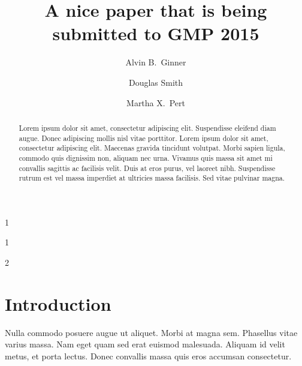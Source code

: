 \documentclass[submission]{gmp2015}
\begin{document}
%
%
\title{A nice paper that is being submitted to GMP 2015}

%
%

%
%
\author{Alvin B.\ Ginner}{1}
\author{Douglas Smith}{1}
\author{Martha X.\ Pert}{2}

%
%

%
%


\maketitle

\begin{abstract}
Lorem ipsum dolor sit amet, consectetur adipiscing elit. Suspendisse eleifend diam augue. Donec adipiscing mollis nisl vitae porttitor. Lorem ipsum dolor sit amet, consectetur adipiscing elit. Maecenas gravida tincidunt volutpat. Morbi sapien ligula, commodo quis dignissim non, aliquam nec urna. Vivamus quis massa sit amet mi convallis sagittis ac facilisis velit. Duis at eros purus, vel laoreet nibh. Suspendisse rutrum est vel massa imperdiet at ultricies massa facilisis. Sed vitae pulvinar magna.
\end{abstract}


\section{Introduction}

Nulla commodo posuere augue ut aliquet. Morbi at magna sem. Phasellus vitae varius massa. Nam eget quam sed erat euismod malesuada. Aliquam id velit metus, et porta lectus. Donec convallis massa quis eros accumsan consectetur.
\end{document}
